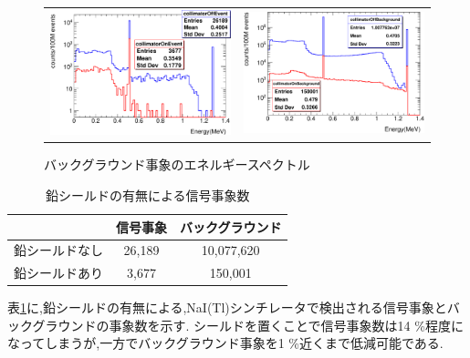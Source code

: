 \begin{figure}[!tbp]
	\begin{tabular}{cc}
	\centering
		\begin{minipage}{0.5\hsize}
		\includegraphics[width=7cm]{fig/test2Event.pdf}
			\caption{鉛シールドの有無で期待される事象のエネルギースペクトル}
	\label{test2Event}
		\end{minipage}&

		\begin{minipage}{0.5\hsize}
	\centering
		\includegraphics[width=7cm]{fig/test2Back.pdf}
			\caption{バックグラウンド事象のエネルギースペクトル}
	\label{test2Back}
		\end{minipage}
		\end{tabular}
\end{figure}

\begin{table}[!tbp]
	\centering
	\caption{鉛シールドの有無による信号事象数}
		\label{table_test2}	
	  \begin{tabular}{ccc} 
		\hline
		   				&信号事象& バックグラウンド \\ 
		\hline \hline
		鉛シールドなし & 26,189 & 10,077,620 \\
		鉛シールドあり & 3,677  & 150,001   \\
		\hline
	  \end{tabular}
\end{table}

表\ref{table_test2}に,鉛シールドの有無による,NaI(Tl)シンチレータで検出される信号事象とバックグラウンドの事象数を示す.
シールドを置くことで信号事象数は14 \%程度になってしまうが,一方でバックグラウンド事象を1 \%近くまで低減可能である.

